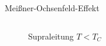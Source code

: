 \begin{frame}{Meißner-Ochsenfeld-Effekt}
\begin{columns}
\begin{column}{0.49\textwidth}
\begin{figure}
    \caption{Supraleitung $T < T_{C}$}
    \label{fig: bfeld_supraleitung}
  \end{figure}
\end{column}
\end{columns}
\end{frame}
